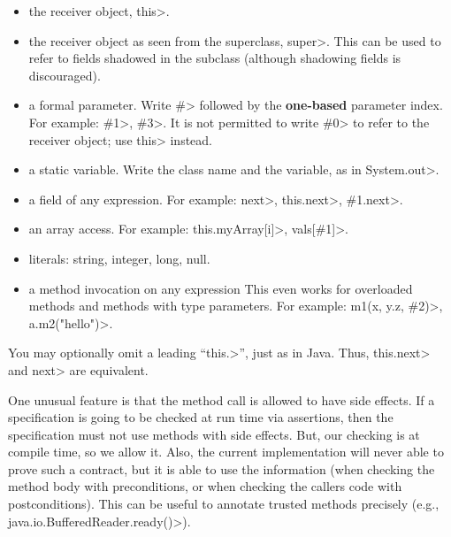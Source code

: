 \begin{itemize}
\item
  the receiver object, \<this>.
\item
  the receiver object as seen from the superclass, \<super>.  This can be used
  to refer to fields shadowed in the subclass (although shadowing fields is
  discouraged).
\item
  a formal parameter.  Write \<\#> followed by the \textbf{one-based} parameter
  index.  For example: \<\#1>, \<\#3>.  It is not permitted to write \<\#0> to
  refer to the receiver object; use \<this> instead.

\item
  a static variable.  Write the class name and the variable, as in
  \<System.out>.

\item
  a field of any expression.  For example:  \<next>,
  \<this.next>, \<\#1.next>. %

\item
  an array access.  For example:  \<this.myArray[i]>, \<vals[\#1]>.

\item literals: string, integer, long, null.

\item a method invocation on any expression
  This even works for overloaded methods and methods with type parameters.
  For example:
  \<m1(x, y.z, \#2)>, \<a.m2("hello")>.

\end{itemize}

You may optionally omit a leading ``\<this.>'', just as in Java.  Thus, 
\<this.next> and \<next> are equivalent.

One unusual feature is that the method call is allowed to have side
effects.  If a specification is going to be checked at run time via
assertions, then the specification must not use methods with side
effects.  But, our checking is at compile time, so we allow it.
Also, the current implementation will never able to prove such
a contract, but it is able to use the information (when checking
the method body with preconditions, or when checking the callers
code with postconditions).  This can be useful to annotate trusted
methods precisely (e.g., \<java.io.BufferedReader.ready()>).

